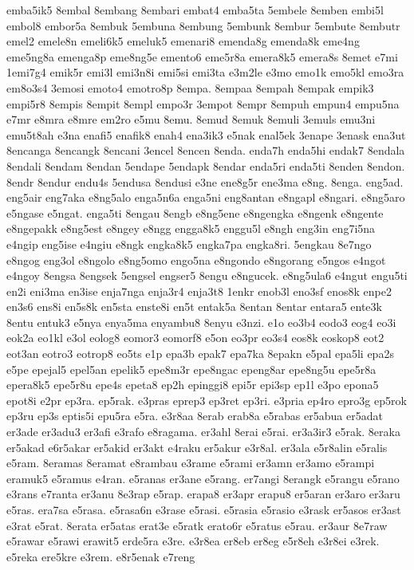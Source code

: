 {emba5ik5 8embal 8embang 8embari embat4 emba5ta 5embele 8emben embi5l
embol8 embor5a 8embuk 5embuna 8embung 5embunk 8embur 5embute 8embutr emel2
emele8n emeli6k5 emeluk5 emenari8 emenda8g emenda8k eme4ng eme5ng8a
emenga8p eme8ng5e emento6 eme5r8a emera8k5 emera8s 8emet e7mi 1emi7g4
emik5r emi3l emi3n8i emi5si emi3ta e3m2le e3mo emo1k emo5kl emo3ra em8o3s4
3emosi emoto4 emotro8p 8empa. 8empaa 8empah 8empak empik3 empi5r8 8empis
8empit 8empl empo3r 3empot 8empr 8empuh empun4 empu5na e7mr e8mra e8mre
em2ro e5mu 8emu. 8emud 8emuk 8emuli 3emuls emu3ni emu5t8ah e3na enafi5
enafik8 enah4 ena3ik3 e5nak enal5ek 3enape 3enask ena3ut 8encanga 8encangk
8encani 3encel 8encen 8enda. enda7h enda5hi endak7 8endala 8endali 8endam
8endan 5endape 5endapk 8endar enda5ri enda5ti 8enden 8endon. 8endr 8endur
endu4s 5endusa 8endusi e3ne ene8g5r ene3ma e8ng. 8enga. eng5ad. eng5air
eng7aka e8ng5alo enga5n6a enga5ni eng8antan e8ngapl e8ngari. e8ng5aro
e5ngase e5ngat. enga5ti 8engau 8engb e8ng5ene e8ngengka e8ngenk e8ngente
e8ngepakk e8ng5est e8ngey e8ngg engga8k5 enggu5l e8ngh eng3in eng7i5na
e4ngip eng5ise e4ngiu e8ngk engka8k5 engka7pa engka8ri. 5engkau 8e7ngo
e8ngog eng3ol e8ngolo e8ng5omo engo5na e8ngondo e8ngorang e5ngos e4ngot
e4ngoy 8engsa 8engsek 5engsel engser5 8engu e8ngucek. e8ng5ula6 e4ngut
engu5ti en2i eni3ma en3ise enja7nga enja3r4 enja3t8 1enkr enob3l eno3sf
enos8k enpe2 en3s6 ens8i en5s8k en5sta enste8i en5t entak5a 8entan 8entar
entara5 ente3k 8entu entuk3 e5nya enya5ma enyambu8 8enyu e3nzi. e1o eo3b4
eodo3 eog4 eo3i eok2a eo1kl e3ol eolog8 eomor3 eomorf8 e5on eo3pr eo3s4
eos8k eoskop8 eot2 eot3an eotro3 eotrop8 eo5ts e1p epa3b epak7 epa7ka
8epakn e5pal epa5li epa2s e5pe epejal5 epel5an epelik5 epe8m3r epe8ngac
epeng8ar epe8ng5u epe5r8a epera8k5 epe5r8u epe4s epeta8 ep2h epinggi8
epi5r epi3sp ep1l e3po epona5 epot8i e2pr ep3ra. ep5rak. e3pras eprep3
ep3ret ep3ri. e3pria ep4ro epro3g ep5rok ep3ru ep3s eptis5i epu5ra e5ra.
e3r8aa 8erab erab8a e5rabas er5abua er5adat er3ade er3adu3 er3afi e3rafo
e8ragama. er3ahl 8erai e5rai. er3a3ir3 e5rak. 8eraka er5akad e6r5akar
er5akid er3akt e4raku er5akur e3r8al. er3ala e5r8alin e5ralis e5ram.
8eramas 8eramat e8rambau e3rame e5rami er3amn er3amo e5rampi eramuk5
e5ramus e4ran. e5ranas er3ane e5rang. er7angi 8erangk e5rangu e5rano
e3rans e7ranta er3anu 8e3rap e5rap. erapa8 er3apr erapu8 er5aran er3aro
er3aru e5ras. era7sa e5rasa. e5rasa6n e3rase e5rasi. e5rasia e5rasio
e3rask er5asos er3ast e3rat e5rat. 8erata er5atas erat3e e5ratk erato6r
e5ratus e5rau. er3aur 8e7raw e5rawar e5rawi erawit5 erde5ra e3re. e3r8ea
er8eb er8eg e5r8eh e3r8ei e3rek. e5reka ere5kre e3rem. e8r5enak e7reng
}
